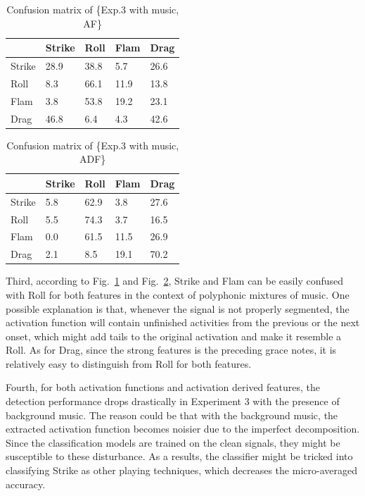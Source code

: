 \documentclass{article}
\begin{document}
\begin{table}[]
\centering
\begin{tabular}{l|llll}
       & Strike & Roll & Flam & Drag \\ \hline
Strike & 28.9   & 38.8 & 5.7  & 26.6 \\
Roll   & 8.3    & 66.1 & 11.9 & 13.8 \\
Flam   & 3.8    & 53.8 & 19.2 & 23.1 \\
Drag   & 46.8   & 6.4  & 4.3  & 42.6
\end{tabular}
\caption{Confusion matrix of \{Exp.3 with music, AF\}}
\label{EXP3_music_AF}
\end{table}

\begin{table}[]
\centering
\begin{tabular}{l|llll}
       & Strike & Roll & Flam & Drag \\ \hline
Strike & 5.8    & 62.9 & 3.8  & 27.6 \\
Roll   & 5.5    & 74.3 & 3.7  & 16.5 \\
Flam   & 0.0    & 61.5 & 11.5 & 26.9 \\
Drag   & 2.1    & 8.5  & 19.1 & 70.2
\end{tabular}
\caption{Confusion matrix of \{Exp.3 with music, ADF\}}
\label{EXP3_music_ADF}
\end{table}

Third, according to Fig.~\ref{EXP3_music_AF} and Fig.~\ref{EXP3_music_ADF}, Strike and Flam can be easily confused with Roll for both features in the context of polyphonic mixtures of music. One possible explanation is that, whenever the signal is not properly segmented, the activation function will contain unfinished activities from the previous or the next onset, which might add tails to the original activation and make it resemble a Roll. As for Drag, since the strong features is the preceding grace notes, it is relatively easy to distinguish from Roll for both features.  

Fourth, for both activation functions and activation derived features, the detection performance drops drastically in Experiment 3 with the presence of background music. The reason could be that with the background music, the extracted activation function becomes noisier due to the imperfect decomposition. Since the classification models are trained on the clean signals, they might be susceptible to these disturbance. As a results, the classifier might be tricked into classifying Strike as other playing techniques, which decreases the micro-averaged accuracy. 
\end{document}
